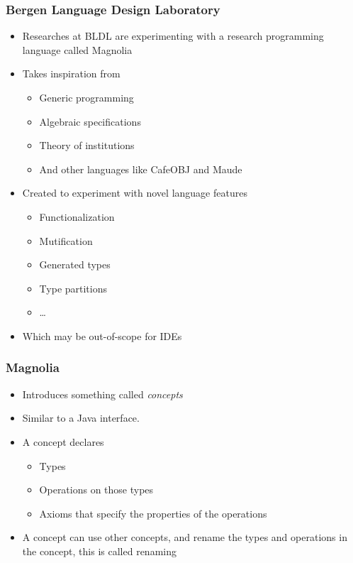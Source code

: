 \begin{frame}
  \frametitle{Bergen Language Design Laboratory}
  \begin{itemize}
    \item Researches at BLDL are experimenting with a research programming
      language called Magnolia
      \pause
    \item Takes inspiration from
      \begin{itemize}
        \item Generic programming
        \item Algebraic specifications
        \item Theory of institutions
        \item And other languages like CafeOBJ and Maude
      \end{itemize}
    \item Created to experiment with novel language features
      \pause
      \begin{itemize}
        \item Functionalization
        \item Mutification
        \item Generated types
        \item Type partitions
        \item \dots
          \pause
      \end{itemize}
    \item Which may be out-of-scope for IDEs
  \end{itemize}
\end{frame}

\begin{frame}
  \frametitle{Magnolia}
  \begin{itemize}
    \item Introduces something called \textit{concepts}
    \item Similar to a Java interface.
      \pause
    \item A concept declares
      \begin{itemize}
        \item Types
        \item Operations on those types
        \item Axioms that specify the properties of the operations
      \end{itemize}
    \item A concept can use other concepts, and rename the types and operations
      in the concept, this is called renaming
  \end{itemize}
\end{frame}

